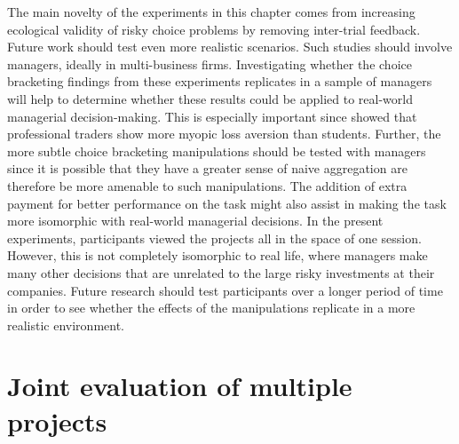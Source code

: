 \documentclass[a4paper, nobind, dvipsnames]{templates/ociamthesis}
\theoremstyle{definition}
\theoremstyle{definition}
\theoremstyle{definition}
\theoremstyle{definition}
\theoremstyle{remark}
\begin{document}
The main novelty of the experiments in this chapter comes from increasing
ecological validity of risky choice problems by removing inter-trial feedback.
Future work should test even more realistic scenarios. Such studies should
involve managers, ideally in multi-business firms. Investigating whether the
choice bracketing findings from these experiments replicates in a sample of
managers will help to determine whether these results could be applied to
real-world managerial decision-making. This is especially important since
\textcite{haigh2005} showed that professional traders show more myopic loss aversion than
students. Further, the more subtle choice bracketing manipulations should be
tested with managers since it is possible that they have a greater sense of
naive aggregation are therefore be more amenable to such manipulations. The
addition of extra payment for better performance on the task might also assist
in making the task more isomorphic with real-world managerial decisions. In the
present experiments, participants viewed the projects all in the space of one
session. However, this is not completely isomorphic to real life, where managers
make many other decisions that are unrelated to the large risky investments at
their companies. Future research should test participants over a longer period
of time in order to see whether the effects of the manipulations replicate in a
more realistic environment.

\newpage

\printbibliography[segment=\therefsegment,heading=subbibintoc]

\hypertarget{interstitial-1}{%
\chapter{Joint evaluation of multiple projects}\label{interstitial-1}}
\end{document}
